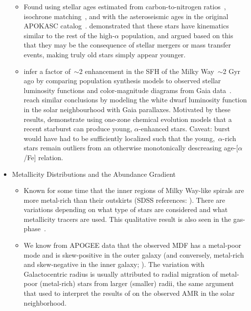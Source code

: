 \documentclass[fleqn, usenatbib]{mnras}
\begin{document}
\begin{itemize}
\begin{itemize}
		\item Found using stellar ages estimated from carbon-to-nitrogen 
		ratios~\citep{Martig2016}, isochrone matching~\citep{Feuillet2018, 
		Feuillet2019}, and with the asteroseismic ages in the original APOKASC 
		catalog~\citep{Chiappini2015, SilvaAguirre2018, Pinsonneault2014}. 
		\citet{SilvaAguirre2018} demonstrated that these stars have 
		kinematics similar to the rest of the high-$\alpha$ population, and 
		argued based on this that they may be the consequence of stellar 
		mergers or mass transfer events, making truly old stars simply appear 
		younger. 

		\item \citet{Mor2019} infer a factor of~$\sim$2 enhancement in the 
		SFH of the Milky Way~$\sim$2 Gyr ago by comparing population synthesis 
		models to observed stellar luminosity functions and color-magnitude 
		diagrams from Gaia data~\citep{GaiaDR2}.~\citet{Isern2019} reach 
		similar conclusions by modeling the white dwarf luminosity function in 
		the solar neighbourhood with Gaia parallaxes. Motivated by these 
		results, \citet{Johnson2020} demonstrate using one-zone chemical 
		evolution models that a recent starburst can produce young, 
		$\alpha$-enhanced stars. Caveat: burst would have had to be 
		sufficiently localized such that the young,~$\alpha$-rich stars remain 
		outliers from an otherwise monotonically descreasing age-[$\alpha$/Fe] 
		relation. 
	\end{itemize} 

	\item Metallicity Distributions and the Abundance Gradient 
	\begin{itemize} 
		\item Known for some time that the inner regions of Milky Way-like 
		spirals are more metal-rich than their outskirts (SDSS references: 
		\citealp{Nordstroem2004a, Daflon2009, Frinchaboy2013, Hayden2014}). 
		There are variations depending on what type of stars are considered 
		and what metallicity tracers are used. This qualitative result is 
		also seen in the gas-phase~\citep[see, e.g., the results from the 
		CHAOS project using HII regions;][]{Berg2015, Berg2020}. 

		\item We know from APOGEE data that the observed MDF has a metal-poor 
		mode and is skew-positive in the outer galaxy (and conversely, 
		metal-rich and skew-negative in the inner galaxy; 
		\citealp{Hayden2015}). The variation with Galactocentric radius is 
		usually attributed to radial migration of metal-poor (metal-rich) 
		stars from larger (smaller) radii, the same argument that 
		\citep{Sellwood2002} used to interpret the results of 
		\citet{Edvardsson1993} on the observed AMR in the solar neighborhood. 


\end{itemize}
\end{itemize}
\end{document}
